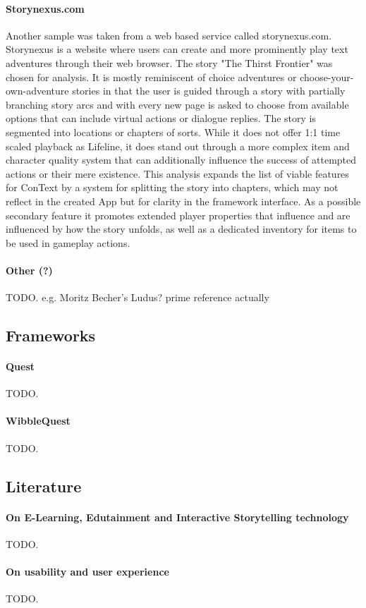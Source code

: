 \paragraph{Storynexus.com}
Another sample was taken from a web based service called storynexus.com. Storynexus is a website where users can create and more prominently play text adventures through their web browser. The story "The Thirst Frontier" was chosen for analysis. It is mostly reminiscent of choice adventures or choose-your-own-adventure stories in that the user is guided through a story with partially branching story arcs and with every new page is asked to choose from available options that can include virtual actions or dialogue replies. The story is segmented into locations or chapters of sorts. While it does not offer 1:1 time scaled playback as Lifeline, it does stand out through a more complex item and character quality system that can additionally influence the success of attempted actions or their mere existence. 
This analysis expands the list of viable features for ConText by a system for splitting the story into chapters, which may not reflect in the created App but for clarity in the framework interface. As a possible secondary feature it promotes extended player properties that influence and are influenced by how the story unfolds, as well as a dedicated inventory for items to be used in gameplay actions. 
\paragraph{Other (?)}
TODO. e.g. Moritz Becher's Ludus? prime reference actually

\subsection{Frameworks}
\paragraph{Quest}
TODO.
\paragraph{WibbleQuest}
TODO.

\subsection{Literature}
\paragraph{On E-Learning, Edutainment and Interactive Storytelling technology}
TODO.
\paragraph{On usability and user experience}
TODO.